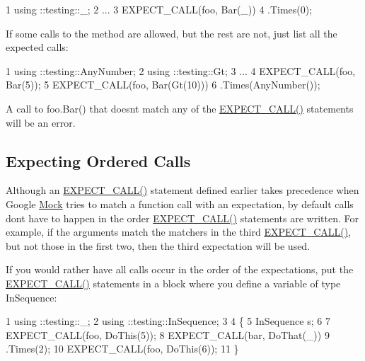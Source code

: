 \begin{DoxyCode}
1 using ::testing::\_;
2 ...
3   EXPECT\_CALL(foo, Bar(\_))
4       .Times(0);
\end{DoxyCode}


If some calls to the method are allowed, but the rest are not, just list all the expected calls\+:


\begin{DoxyCode}
1 using ::testing::AnyNumber;
2 using ::testing::Gt;
3 ...
4   EXPECT\_CALL(foo, Bar(5));
5   EXPECT\_CALL(foo, Bar(Gt(10)))
6       .Times(AnyNumber());
\end{DoxyCode}


A call to {\ttfamily foo.\+Bar()} that doesn\textquotesingle{}t match any of the {\ttfamily \hyperlink{gmock-spec-builders_8h_a535a6156de72c1a2e25a127e38ee5232}{E\+X\+P\+E\+C\+T\+\_\+\+C\+A\+L\+L()}} statements will be an error.

\subsection*{Expecting Ordered Calls}

Although an {\ttfamily \hyperlink{gmock-spec-builders_8h_a535a6156de72c1a2e25a127e38ee5232}{E\+X\+P\+E\+C\+T\+\_\+\+C\+A\+L\+L()}} statement defined earlier takes precedence when Google \hyperlink{class_mock}{Mock} tries to match a function call with an expectation, by default calls don\textquotesingle{}t have to happen in the order {\ttfamily \hyperlink{gmock-spec-builders_8h_a535a6156de72c1a2e25a127e38ee5232}{E\+X\+P\+E\+C\+T\+\_\+\+C\+A\+L\+L()}} statements are written. For example, if the arguments match the matchers in the third {\ttfamily \hyperlink{gmock-spec-builders_8h_a535a6156de72c1a2e25a127e38ee5232}{E\+X\+P\+E\+C\+T\+\_\+\+C\+A\+L\+L()}}, but not those in the first two, then the third expectation will be used.

If you would rather have all calls occur in the order of the expectations, put the {\ttfamily \hyperlink{gmock-spec-builders_8h_a535a6156de72c1a2e25a127e38ee5232}{E\+X\+P\+E\+C\+T\+\_\+\+C\+A\+L\+L()}} statements in a block where you define a variable of type {\ttfamily In\+Sequence}\+:


\begin{DoxyCode}
1 using ::testing::\_;
2 using ::testing::InSequence;
3 
4 \{
5   InSequence s;
6 
7   EXPECT\_CALL(foo, DoThis(5));
8   EXPECT\_CALL(bar, DoThat(\_))
9       .Times(2);
10   EXPECT\_CALL(foo, DoThis(6));
11 \}
\end{DoxyCode}


